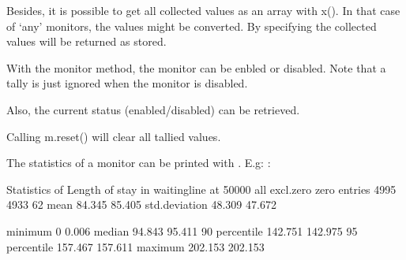 \documentclass[letterpaper,10pt,english]{sphinxmanual}
\begin{document}
Besides, it is possible to get all collected values as an array with x(). In that case of ‘any’ monitors,
the values might be converted. By specifying  the collected values will be returned as stored.

With the monitor method, the monitor can be enbled or disabled. Note that a tally is just ignored when
the monitor is disabled.

Also, the current status (enabled/disabled) can be retrieved.

%
\begin{sphinxVerbatim}[commandchars=\\\{\}]
  
  
 
\end{sphinxVerbatim}

Calling m.reset() will clear all tallied values.

The statistics of a monitor can be printed with .
E.g: :

%
\begin{sphinxVerbatim}[commandchars=\\\{\}]
Statistics of Length of stay in waitingline at     50000
                        all    excl.zero         zero
\PYGZhy{}\PYGZhy{}\PYGZhy{}\PYGZhy{}\PYGZhy{}\PYGZhy{}\PYGZhy{}\PYGZhy{}\PYGZhy{}\PYGZhy{}\PYGZhy{}\PYGZhy{}\PYGZhy{}\PYGZhy{} \PYGZhy{}\PYGZhy{}\PYGZhy{}\PYGZhy{}\PYGZhy{}\PYGZhy{}\PYGZhy{}\PYGZhy{}\PYGZhy{}\PYGZhy{}\PYGZhy{}\PYGZhy{} \PYGZhy{}\PYGZhy{}\PYGZhy{}\PYGZhy{}\PYGZhy{}\PYGZhy{}\PYGZhy{}\PYGZhy{}\PYGZhy{}\PYGZhy{}\PYGZhy{}\PYGZhy{} \PYGZhy{}\PYGZhy{}\PYGZhy{}\PYGZhy{}\PYGZhy{}\PYGZhy{}\PYGZhy{}\PYGZhy{}\PYGZhy{}\PYGZhy{}\PYGZhy{}\PYGZhy{}
entries            4995         4933           62
mean                 84.345       85.405
std.deviation        48.309       47.672

minimum               0            0.006
median               94.843       95.411
90\PYGZpc{} percentile      142.751      142.975
95\PYGZpc{} percentile      157.467      157.611
maximum             202.153      202.153
\end{sphinxVerbatim}
\end{document}
